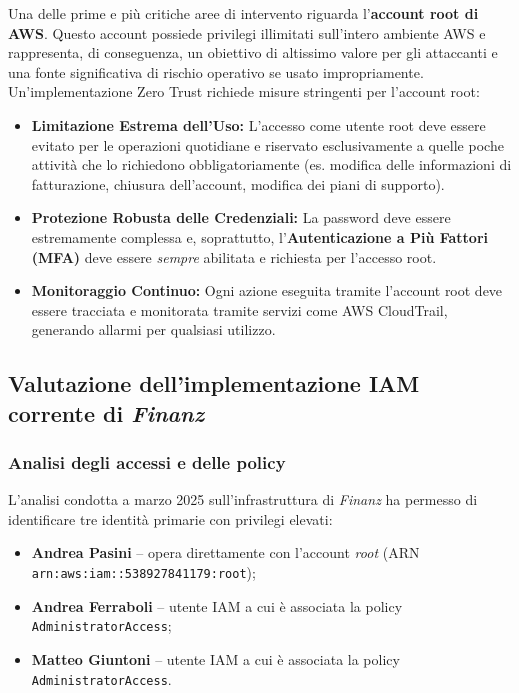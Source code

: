 Una delle prime e più critiche aree di intervento riguarda l'\textbf{account root di AWS}. Questo account possiede privilegi illimitati sull'intero ambiente AWS e rappresenta, di conseguenza, un obiettivo di altissimo valore per gli attaccanti e una fonte significativa di rischio operativo se usato impropriamente. Un'implementazione Zero Trust richiede misure stringenti per l'account root:
\begin{itemize}
    \item \textbf{Limitazione Estrema dell'Uso:} L'accesso come utente root deve essere evitato per le operazioni quotidiane e riservato esclusivamente a quelle poche attività che lo richiedono obbligatoriamente (es. modifica delle informazioni di fatturazione, chiusura dell'account, modifica dei piani di supporto).
    \item \textbf{Protezione Robusta delle Credenziali:} La password deve essere estremamente complessa e, soprattutto, l'\textbf{Auten\-ticazione a Più Fattori (MFA)} deve essere \textit{sempre} abilitata e richiesta per l'accesso root.
    \item \textbf{Monitoraggio Continuo:} Ogni azione eseguita tramite l'account root deve essere tracciata e monitorata tramite servizi come AWS CloudTrail, generando allarmi per qualsiasi utilizzo.
\end{itemize}


\subsection{Valutazione dell'implementazione IAM corrente di \emph{Finanz}}
\label{subsec:analisi_iam_finanz}

\subsubsection*{Analisi degli accessi e delle policy}
L'analisi condotta a marzo 2025 sull'infrastruttura di \emph{Finanz} ha permesso di identificare tre identità primarie con privilegi elevati:

\begin{itemize}
    \item \textbf{Andrea Pasini} – opera direttamente con l'account \emph{root} (ARN \texttt{arn:aws:iam::538927841179:root});
    \item \textbf{Andrea Ferraboli} – utente IAM a cui è associata la policy \texttt{AdministratorAccess};
    \item \textbf{Matteo Giuntoni} – utente IAM a cui è associata la policy \texttt{AdministratorAccess}.
\end{itemize}

